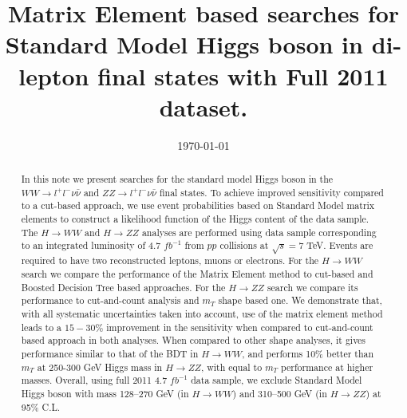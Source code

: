 \documentclass{cmspaper}
\begin{document}
\begin{titlepage}


\date{\today}

\title{Matrix Element based searches for Standard Model Higgs boson in di-lepton final states with Full 2011 dataset.}



\begin{abstract}
In this note we present searches for the standard model Higgs boson in the $WW \rightarrow l^{+}l^{-}\nu\bar{\nu}$ and $ZZ \rightarrow l^{+}l^{-}\nu\bar{\nu}$ 
final states. To achieve improved sensitivity compared to a cut-based approach, we use event probabilities based on Standard Model matrix elements to construct a likelihood function of the Higgs content of the data sample. The $H\rightarrow WW$ and $H\rightarrow ZZ$ analyses are performed using data sample corresponding to an integrated luminosity of 4.7 $fb^{-1}$  from $pp$ collisions at $\sqrt{s}=7$ TeV.
Events are required to have two reconstructed leptons, muons or electrons. For the $H\rightarrow WW$ search we compare the performance of the 
Matrix Element method to cut-based and Boosted Decision Tree based approaches. For the $H\rightarrow ZZ$ search we compare its performance to cut-and-count analysis and $m_{T}$ shape based one. We demonstrate that, with all systematic uncertainties taken into account, use of the matrix element method leads to a $15-30 \%$ improvement in the sensitivity when compared to cut-and-count based approach in both analyses. When compared to other shape analyses, it gives performance similar to that of the BDT in $H\rightarrow WW$, and performs 10\% better than $m_{T}$ at 250-300 GeV Higgs mass in $H\rightarrow ZZ$, with equal to $m_{T}$ performance at higher masses. Overall, using full 2011 4.7 $fb^{-1}$ data sample, we exclude Standard Model Higgs boson with mass 128--270 GeV (in $H\rightarrow WW$) and 310--500 GeV (in $H\rightarrow ZZ$) at 95\% C.L. 
\end{abstract}


\end{titlepage}
\tableofcontents
\newpage 

\end{document}
